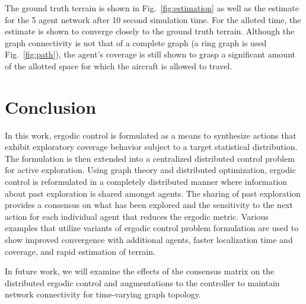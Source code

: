 \documentclass[letterpaper, 10 pt,  conference, twoside]{IEEEtran/IEEEtran}
\theoremstyle{definition}
\begin{document}
The ground truth terrain is shown in Fig.~\ref{fig:estimation} as well as the estimate for the 5 agent network after 10 second simulation time. For the alloted time, the estimate is shown to converge closely to the ground truth terrain. Although the graph connectivity is not that of a complete graph (a ring graph is used Fig.~\ref{fig:path}), the agent's coverage is still shown to grasp a significant amount of the allotted space for which the aircraft is allowed to travel.

\section{Conclusion} \label{sec:conc}

In this work, ergodic control is formulated as a means to synthesize actions that exhibit exploratory coverage behavior subject to a target statistical distribution. The formulation is then extended into a centralized distributed control problem for active exploration. Using graph theory and distributed optimization, ergodic control is reformulated in a completely distributed manner where information about past exploration is shared amongst agents. The sharing of past exploration provides a consensus on what has been explored and the sensitivity to the next action for each individual agent that reduces the ergodic metric. Various examples that utilize variants of ergodic control problem formulation are used to show improved convergence with additional agents, faster localization time and coverage, and rapid estimation of terrain.

In future work, we will examine the effects of the consensus matrix on the distributed ergodic control and augmentations to the controller to maintain network connectivity for time-varying graph topology.



\balance
\end{document}
